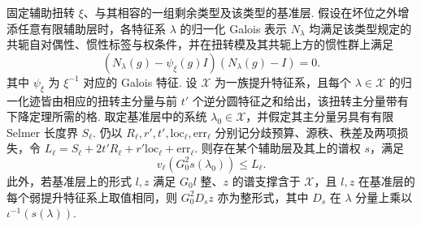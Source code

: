 \begin{lemma}[基准层上的一阶分母估计]
\label{lem:c-base-denominator}
\emitthmsource
固定辅助扭转 $\xi$、与其相容的一组剩余类型及该类型的基准层. 假设在坏位之外增添任意有限辅助层时，各特征系 $\lambda$ 的归一化 Galois 表示 $N_\lambda$ 均满足该类型规定的共轭自对偶性、惯性标签与权条件，并在扭转模及其共轭上方的惯性群上满足
\[
 (N_\lambda(g)-\psi_\xi(g)I)(N_\lambda(g)-I)=0 .
\]
其中 $\psi_\xi$ 为 $\xi^{-1}$ 对应的 Galois 特征. 设 $\mathcal X$ 为一族提升特征系，且每个 $\lambda\in\mathcal X$ 的归一化迹皆由相应的扭转主分量与前 $t'$ 个逆分圆特征之和给出，该扭转主分量带有下降定理所需的格. 取定基准层中的系统 $\lambda_0\in\mathcal X$，并假定其主分量另具有有限 Selmer 长度界 $S_\ell$. 仍以 $R_\ell,r',t',\mathrm{loc}_\ell,\mathrm{err}_\ell$ 分别记分歧预算、源秩、秩差及两项损失，令 $L_\ell=S_\ell+2t'R_\ell+r'\mathrm{loc}_\ell+\mathrm{err}_\ell$. 则存在某个辅助层及其上的谱权 $s$，满足
\[
 v_\ell(G_0^2s(\lambda_0))\le L_\ell.
\]
此外，若基准层上的形式 $l,z$ 满足 $G_0l$ 整、$z$ 的谱支撑含于 $\mathcal X$，且 $l,z$ 在基准层的每个弱提升特征系上取值相同，则 $G_0^2D_s z$ 亦为整形式，其中 $D_s$ 在 $\lambda$ 分量上乘以 $\iota^{-1}(s(\lambda))$.
\end{lemma}
